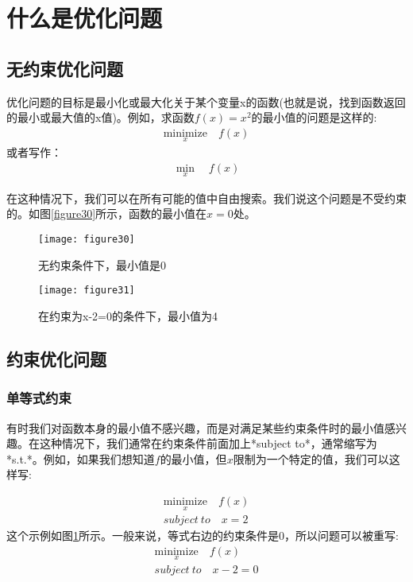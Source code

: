 \section{什么是优化问题}

\subsection{无约束优化问题}

优化问题的目标是最小化或最大化关于某个变量x的函数(也就是说，找到函数返回的最小或最大值的x值)。例如，求函数$f(x)=x^2$的最小值的问题是这样的:
\begin{gather*}
\underset{x}{\text{minimize}} \quad f(x)
\end{gather*}
或者写作：
\begin{gather*}
\min_x \quad f(x)
\end{gather*}

在这种情况下，我们可以在所有可能的值中自由搜索。我们说这个问题是不受约束的。如图\ref{figure30}所示，函数的最小值在$x=0$处。

\begin{figure}[ht]
    \begin{minipage}{.5\linewidth}
        \centering
	    \texttt{[image: figure30]}
	    \caption{无约束条件下，最小值是0}
	    \label{figure30}
    \end{minipage}
    \begin{minipage}{.5\linewidth}
        \centering
	    \texttt{[image: figure31]}
	    \caption{在约束为x-2=0的条件下，最小值为4}
	    \label{figure31}
    \end{minipage}
\end{figure}

\subsection{约束优化问题}

\subsubsection{单等式约束}
有时我们对函数本身的最小值不感兴趣，而是对满足某些约束条件时的最小值感兴趣。在这种情况下，我们通常在约束条件前面加上*subject to*，通常缩写为*s.t.*。例如，如果我们想知道$f$的最小值，但$x$限制为一个特定的值，我们可以这样写:

\begin{gather*}
\underset{x}{\text{minimize}} \quad f(x) \\
subject \ to \quad x=2
\end{gather*}
这个示例如图\ref{figure31}所示。一般来说，等式右边的约束条件是0，所以问题可以被重写:
\begin{gather*}
\underset{x}{\text{minimize}} \quad f(x) \\
subject \ to \quad x-2=0
\end{gather*}

